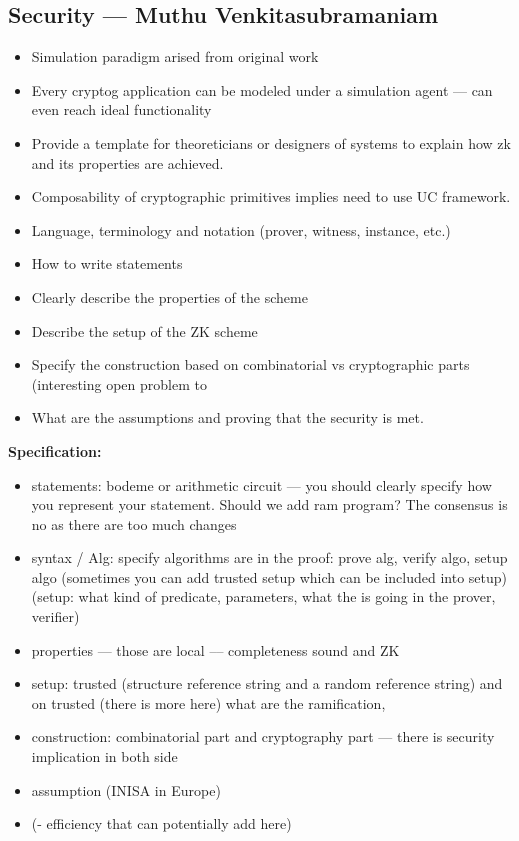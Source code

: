 \subsection{Security --- Muthu Venkitasubramaniam}
\label{sec:zcon0:session1-overview:security}

\begin{itemize}[label={- }]
\item Simulation paradigm arised from original work
\item Every cryptog application can be modeled under a simulation agent --- can even reach ideal functionality
\item Provide a template for theoreticians or designers of systems to explain how zk and its properties are achieved.
\item Composability of cryptographic primitives implies need to use UC framework.
\item Language, terminology and notation (prover, witness, instance, etc.)
\item How to write statements
\item Clearly describe the properties of the scheme
\item Describe the setup of the ZK scheme
\item Specify the construction based on combinatorial vs cryptographic parts (interesting open problem to
\item What are the assumptions and proving that the security is met.
\end{itemize}

{\bfseries Specification:}
\begin{itemize}[label={- }]
\item statements: bodeme or arithmetic circuit --- you should clearly specify how you represent your
statement. Should we add ram program? The consensus is no as there are too much changes
\item syntax / Alg: specify algorithms are in the proof: prove alg, verify algo, setup algo (sometimes
you can add trusted setup which can be included into setup) (setup: what kind of predicate,
parameters, what the is going in the prover, verifier)
\item properties --- those are local --– completeness sound and ZK
\item setup: trusted (structure reference string and a random reference string) and on trusted (there
is more here) what are the ramification,
\item construction: combinatorial part and cryptography part --- there is security implication in both
side
\item assumption (INISA in Europe)
\item[\hspace*{-1em}] (- efficiency that can potentially add here)
\end{itemize}

